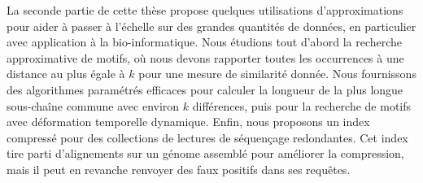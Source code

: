 La seconde partie de cette thèse propose quelques utilisations d'approximations pour aider à passer à l'échelle sur des grandes quantités de données, en particulier avec application à la bio-informatique.
%
Nous étudions tout d'abord la recherche approximative de motifs, où nous devons rapporter toutes les occurrences à une distance au plus égale à $k$ pour une mesure de similarité donnée.
Nous fournissons des algorithmes paramétrés efficaces pour calculer la longueur de la plus longue sous-chaîne commune avec environ $k$ différences, puis pour la recherche de motifs avec déformation temporelle dynamique.
Enfin, nous proposons un index compressé pour des collections de lectures de séquençage redondantes. Cet index tire parti d'alignements sur un génome assemblé pour améliorer la compression, mais il peut en revanche renvoyer des faux positifs dans ses requêtes.